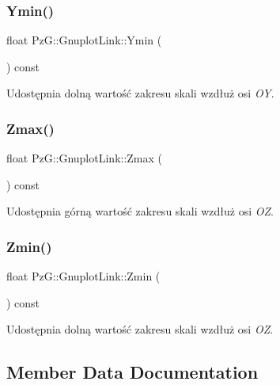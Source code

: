 \subsubsection{\texorpdfstring{Ymin()}{Ymin()}}
{\footnotesize\ttfamily float Pz\+G\+::\+Gnuplot\+Link\+::\+Ymin (\begin{DoxyParamCaption}{ }\end{DoxyParamCaption}) const\hspace{0.3cm}{\ttfamily [inline]}}

Udostępnia dolną wartość zakresu skali wzdłuż osi {\itshape OY}. \mbox{\label{class_pz_g_1_1_gnuplot_link_a2705f7ee3528734ddcd28f2b8de9af0d}} 
\subsubsection{\texorpdfstring{Zmax()}{Zmax()}}
{\footnotesize\ttfamily float Pz\+G\+::\+Gnuplot\+Link\+::\+Zmax (\begin{DoxyParamCaption}{ }\end{DoxyParamCaption}) const\hspace{0.3cm}{\ttfamily [inline]}}

Udostępnia górną wartość zakresu skali wzdłuż osi {\itshape OZ}. \mbox{\label{class_pz_g_1_1_gnuplot_link_a3d360b728e1c4d550f7e7253751e0f0a}} 
\subsubsection{\texorpdfstring{Zmin()}{Zmin()}}
{\footnotesize\ttfamily float Pz\+G\+::\+Gnuplot\+Link\+::\+Zmin (\begin{DoxyParamCaption}{ }\end{DoxyParamCaption}) const\hspace{0.3cm}{\ttfamily [inline]}}

Udostępnia dolną wartość zakresu skali wzdłuż osi {\itshape OZ}. 

\subsection{Member Data Documentation}
\mbox{\label{class_pz_g_1_1_gnuplot_link_adefdb7c360e54c586b1d6bd1fa5c6eee}} 
